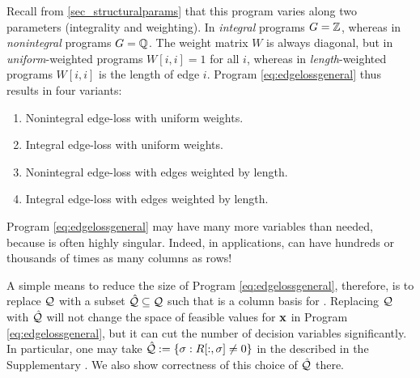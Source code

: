  Recall from \se \eqref{sec_structuralparams} that this program varies along two parameters (integrality and weighting).  In \emph{integral} programs $G = \mathbb{Z}$, whereas in \emph{nonintegral} programs $G = \mathbb{Q}$.  The weight matrix $W$ is always diagonal, but in \emph{uniform}-weighted programs $W[i,i] = 1$ for all $i$, whereas in \emph{length}-weighted programs $W[i,i]$ is the length of edge $i$.  Program \ref{eq:edgelossgeneral} thus results in four variants:

\begin{enumerate}[style=multiline]
    \item[\namedlabel{itm:edge_NIU}{$\Edge\NI\unif$}] Nonintegral edge-loss with uniform weights.
    \item[\namedlabel{itm:edge_IU}{$\Edge\I\unif$}] Integral edge-loss with uniform weights.
    \item[\namedlabel{itm:edge_NIL}{$\Edge\NI\len$}] Nonintegral edge-loss with edges weighted by length. 
    \item[\namedlabel{itm:edge_IL}{$\Edge\I\len$}] Integral edge-loss with edges weighted by length. 
\end{enumerate}

  
Program \eqref{eq:edgelossgeneral} may have many more variables than needed, because \DIFdelbegin {}\DIFdelend \DIFaddbegin {}\DIFaddend is often highly singular.  Indeed, in  applications, \DIFdelbegin {}\DIFdelend \DIFaddbegin {}\DIFaddend can have hundreds or thousands of times as many columns as rows!

A simple means to reduce the size of Program \eqref{eq:edgelossgeneral}, therefore, is to replace $\mathcal Q$ with a subset $\hat {\mathcal Q} \subseteq \mathcal Q$ such that \DIFdelbegin \DIFdel{$\partial_2[\goodedges, \hat \goodtriangles]$ }\DIFdelend \DIFaddbegin {}\DIFaddend is a column basis for \DIFdelbegin \DIFdel{$\partial_2[\goodedges, \goodtriangles]$}\DIFdelend \DIFaddbegin {}\DIFaddend .  Replacing $\mathcal Q$ with $\hat {\mathcal Q}$ will not change the space of feasible values for $\mathbf{x}$ in Program \eqref{eq:edgelossgeneral}, but it can cut the number of decision variables significantly. In particular, one may take $\hat {\mathcal Q} : = \{ \sigma : R[:, \sigma] \neq 0\}$ in the \DIFdelbegin {}\DIFdelend \DIFaddbegin {}\DIFaddend described in the Supplementary \DIFdelbegin {}\DIFdelend \DIFaddbegin {}\DIFaddend .  We also show correctness of this choice of $\hat {\mathcal Q}$ there.


